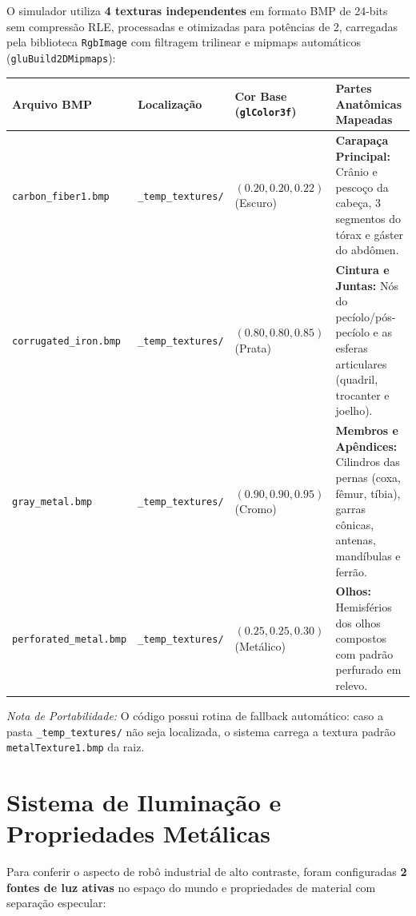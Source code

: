 \documentclass[11pt,a4paper]{article}
\begin{document}
O simulador utiliza \textbf{4 texturas independentes} em formato BMP de 24-bits sem compressão RLE, processadas e otimizadas para potências de 2, carregadas pela biblioteca \texttt{RgbImage} com filtragem trilinear e mipmaps automáticos (\texttt{gluBuild2DMipmaps}):

\begin{table}[h!]
\centering
\small
\begin{tabularx}{\textwidth}{l l l X}
\toprule
\textbf{Arquivo BMP} & \textbf{Localização} & \textbf{Cor Base (\texttt{glColor3f})} & \textbf{Partes Anatômicas Mapeadas} \\
\midrule
\texttt{carbon\_fiber1.bmp} & \texttt{\_temp\_textures/} & $(0.20, 0.20, 0.22)$ (Escuro) & \textbf{Carapaça Principal:} Crânio e pescoço da cabeça, 3 segmentos do tórax e gáster do abdômen. \\
\texttt{corrugated\_iron.bmp} & \texttt{\_temp\_textures/} & $(0.80, 0.80, 0.85)$ (Prata) & \textbf{Cintura e Juntas:} Nós do pecíolo/pós-pecíolo e as esferas articulares (quadril, trocanter e joelho). \\
\texttt{gray\_metal.bmp} & \texttt{\_temp\_textures/} & $(0.90, 0.90, 0.95)$ (Cromo) & \textbf{Membros e Apêndices:} Cilindros das pernas (coxa, fêmur, tíbia), garras cônicas, antenas, mandíbulas e ferrão. \\
\texttt{perforated\_metal.bmp} & \texttt{\_temp\_textures/} & $(0.25, 0.25, 0.30)$ (Metálico) & \textbf{Olhos:} Hemisférios dos olhos compostos com padrão perfurado em relevo. \\
\bottomrule
\end{tabularx}
\end{table}

\textit{Nota de Portabilidade:} O código possui rotina de fallback automático: caso a pasta \texttt{\_temp\_textures/} não seja localizada, o sistema carrega a textura padrão \texttt{metalTexture1.bmp} da raiz.

\section{Sistema de Iluminação e Propriedades Metálicas}

Para conferir o aspecto de robô industrial de alto contraste, foram configuradas \textbf{2 fontes de luz ativas} no espaço do mundo e propriedades de material com separação especular:
\end{document}
